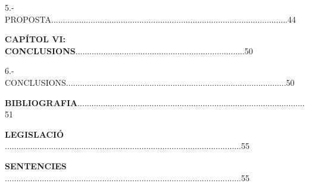 \documentclass[12pt]{article}
\renewcommand{\_}{\kern-1.5pt\textunderscore\kern-1.5pt}
\begin{document}
\vspace{\baselineskip}
\begin{justify}
5.- PROPOSTA......................................................................................................44
\end{justify}\par


\vspace{\baselineskip}

\vspace{\baselineskip}
\begin{justify}
\textbf{CAPÍTOL VI: CONCLUSIONS}.........................................................................50
\end{justify}\par


\vspace{\baselineskip}

\vspace{\baselineskip}
\begin{justify}
6.- CONCLUSIONS...............................................................................................50
\end{justify}\par


\vspace{\baselineskip}

\vspace{\baselineskip}
\begin{justify}
\textbf{BIBLIOGRAFIA}..................................................................................................51
\end{justify}\par


\vspace{\baselineskip}

\vspace{\baselineskip}
\begin{justify}
\textbf{LEGISLACIÓ }......................................................................................................55
\end{justify}\par


\vspace{\baselineskip}

\vspace{\baselineskip}
\begin{justify}
\textbf{SENTENCIES }......................................................................................................55
\end{justify}\par
\end{document}
